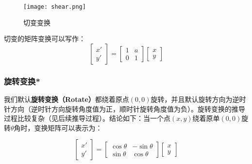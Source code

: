 \documentclass[openany]{progbookcn}
\begin{document}
\begin{figure}[H]
	\centering
	\texttt{[image: shear.png]}
	\caption{切变变换}
	\label{fig:shear}
\end{figure}

切变的矩阵变换可以写作：
\begin{equation}
	\begin{bmatrix}x'\\y'\end{bmatrix}=\begin{bmatrix}1&a\\0&1\end{bmatrix}\begin{bmatrix}x\\y\end{bmatrix}
\end{equation}

\subsubsection{旋转变换*}

我们默认\textbf{旋转变换（Rotate）}都绕着原点$(0,0)$旋转，并且默认旋转方向为逆时针方向（逆时针方向旋转角度值为正，顺时针旋转角度值为负）。旋转变换的推导过程比较复杂（见后续推导过程）。结论如下：当一个点$(x,y)$绕着原单$(0,0)$旋转$\theta$角时，变换矩阵可以表示为：

\begin{equation}
	\begin{bmatrix}x'\\y'\end{bmatrix}=\begin{bmatrix}\cos\theta&-\sin\theta\\\sin\theta&\cos\theta\end{bmatrix}\begin{bmatrix}x\\y\end{bmatrix}
\end{equation}
\end{document}
